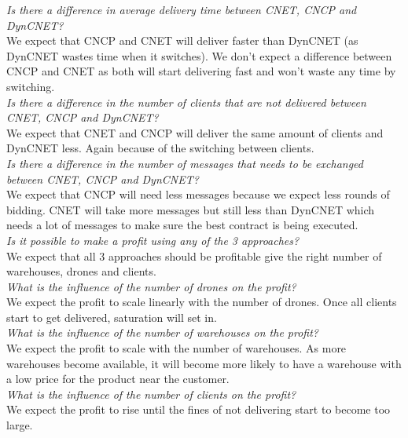 \documentclass[10pt,a4paper,twocolumn]{article}
\begin{document}
\noindent\textit{Is there a difference in average delivery time between CNET, CNCP and DynCNET?} \\
We expect that CNCP and CNET will deliver faster than DynCNET (as DynCNET wastes time when it switches). We don't expect a difference between CNCP and CNET as both will start delivering fast and won't waste any time by switching.\\

\noindent\textit{Is there a difference in the number of clients that are not delivered between CNET, CNCP and DynCNET?} \\
We expect that CNET and CNCP will deliver the same amount of clients and DynCNET less. Again because of the switching between clients.\\

\noindent\textit{Is there a difference in the number of messages that needs to be exchanged between CNET, CNCP and DynCNET?}\\
We expect that CNCP will need less messages because we expect less rounds of bidding. CNET will take more messages but still less than DynCNET which needs a lot of messages to make sure the best contract is being executed. \\

\noindent\textit{Is it possible to make a profit using any of the 3 approaches?}\\
We expect that all 3 approaches should be profitable give the right number of warehouses, drones and clients.\\

\noindent\textit{What is the influence of the number of drones on the profit?}\\
We expect the profit to scale linearly with the number of drones. Once all clients start to get delivered, saturation will set in.\\

\noindent\textit{What is the influence of the number of warehouses on the profit?}\\
We expect the profit to scale with the number of warehouses. As more warehouses become available, it will become more likely to have a warehouse with a low price for the product near the customer.\\

\noindent\textit{What is the influence of the number of clients on the profit?}\\
We expect the profit to rise until the fines of not delivering start to become too large.\\
\end{document}
